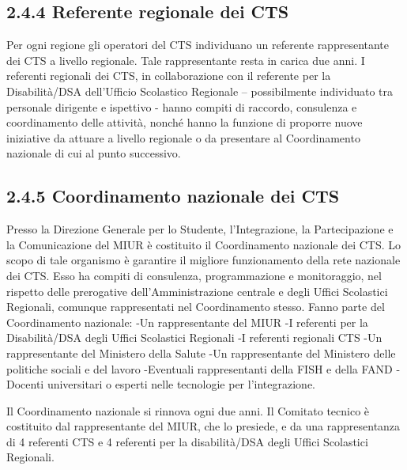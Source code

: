 \subsection*{2.4.4 Referente regionale dei CTS}
Per ogni regione gli operatori del CTS individuano un referente rappresentante dei CTS a livello regionale.
Tale rappresentante resta in carica due anni.
I referenti regionali dei CTS, in collaborazione con il referente per la Disabilità/DSA dell'Ufficio Scolastico
Regionale – possibilmente individuato tra personale dirigente e ispettivo - hanno compiti di raccordo,
consulenza e coordinamento delle attività, nonché hanno la funzione di proporre nuove iniziative da attuare a
livello regionale o da presentare al Coordinamento nazionale di cui al punto successivo.
\subsection*{2.4.5 Coordinamento nazionale dei CTS}
Presso la Direzione Generale per lo Studente, l'Integrazione, la Partecipazione e la Comunicazione del
MIUR è costituito il Coordinamento nazionale dei CTS.
Lo scopo di tale organismo è garantire il migliore funzionamento della rete nazionale dei CTS. Esso ha
compiti di consulenza, programmazione e monitoraggio, nel rispetto delle prerogative dell'Amministrazione
centrale e degli Uffici Scolastici Regionali, comunque rappresentati nel Coordinamento stesso.
Fanno parte del Coordinamento nazionale:
-Un rappresentante del MIUR
-I referenti per la Disabilità/DSA degli Uffici Scolastici Regionali
-I referenti regionali CTS
-Un rappresentante del Ministero della Salute
-Un rappresentante del Ministero delle politiche sociali e del lavoro
-Eventuali rappresentanti della FISH e della FAND
-Docenti universitari o esperti nelle tecnologie per l'integrazione.

Il Coordinamento nazionale si rinnova ogni due anni.
Il Comitato tecnico è costituito dal rappresentante del MIUR, che lo presiede, e da una rappresentanza di 4
referenti CTS e 4 referenti per la disabilità/DSA degli Uffici Scolastici Regionali.

